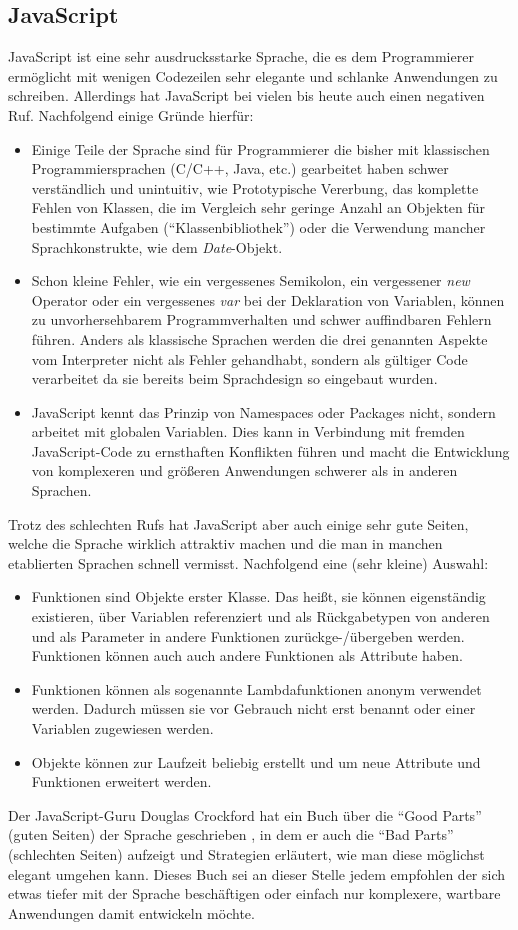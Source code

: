 \subsection{JavaScript}
JavaScript ist eine sehr ausdrucksstarke Sprache, die es dem Programmierer ermöglicht mit wenigen Codezeilen sehr elegante und schlanke Anwendungen zu schreiben. Allerdings hat JavaScript bei vielen bis heute auch einen negativen Ruf. Nachfolgend einige Gründe hierfür:
\begin{itemize}
    \item Einige Teile der Sprache sind für Programmierer die bisher mit klassischen Programmiersprachen (C/C++, Java, etc.) gearbeitet haben schwer verständlich und unintuitiv, wie Prototypische Vererbung, das komplette Fehlen von Klassen, die im Vergleich sehr geringe Anzahl an Objekten für bestimmte Aufgaben ("`Klassenbibliothek"') oder die Verwendung mancher Sprachkonstrukte, wie dem \textit{Date}-Objekt.
    \item Schon kleine Fehler, wie ein vergessenes Semikolon, ein vergessener \textit{new} Operator oder ein vergessenes \textit{var} bei der Deklaration von Variablen, können zu unvorhersehbarem Programmverhalten und schwer auffindbaren Fehlern führen. Anders als klassische Sprachen werden die drei genannten Aspekte vom Interpreter nicht als Fehler gehandhabt, sondern als gültiger Code verarbeitet da sie bereits beim Sprachdesign so eingebaut wurden.
    \item JavaScript kennt das Prinzip von Namespaces oder Packages nicht, sondern arbeitet mit globalen Variablen. Dies kann in Verbindung mit fremden JavaScript-Code zu ernsthaften Konflikten führen und macht die Entwicklung von komplexeren und größeren Anwendungen schwerer als in anderen Sprachen.
\end{itemize}
Trotz des schlechten Rufs hat JavaScript aber auch einige sehr gute Seiten, welche die Sprache wirklich attraktiv machen und die man in manchen etablierten Sprachen schnell vermisst. Nachfolgend eine (sehr kleine) Auswahl:
\begin{itemize}
    \item Funktionen sind Objekte erster Klasse. Das heißt, sie können eigenständig existieren, über Variablen referenziert und als Rückgabetypen von anderen und als Parameter in andere Funktionen zurückge-/übergeben werden. Funktionen können auch auch andere Funktionen als Attribute haben.
    \item Funktionen können als sogenannte Lambdafunktionen anonym verwendet werden. Dadurch müssen sie vor Gebrauch nicht erst benannt oder einer Variablen zugewiesen werden.
    \item Objekte können zur Laufzeit beliebig erstellt und um neue Attribute und Funktionen erweitert werden.
\end{itemize}
Der JavaScript-Guru Douglas Crockford hat ein Buch über die "`Good Parts"' (guten Seiten) der Sprache geschrieben \autocite{JsGoodParts}, in dem er auch die "`Bad Parts"' (schlechten Seiten) aufzeigt und Strategien erläutert, wie man diese möglichst elegant umgehen kann. Dieses Buch sei an dieser Stelle jedem empfohlen der sich etwas tiefer mit der Sprache beschäftigen oder einfach nur komplexere, wartbare Anwendungen damit entwickeln möchte.

